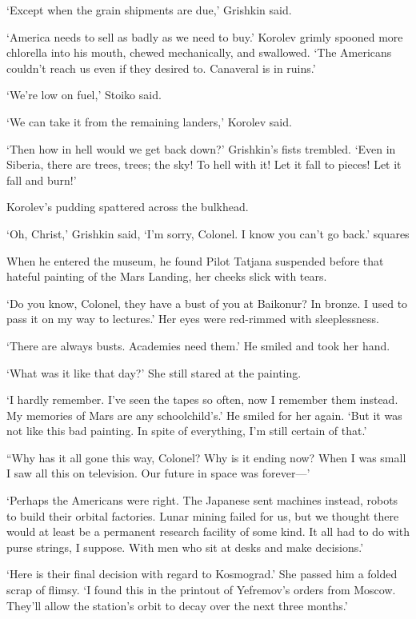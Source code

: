 ‘Except when the grain shipments are due,’ Grishkin said.

‘America needs to sell as badly as we need to buy.’ Korolev grimly spooned more chlorella into his mouth, chewed mechanically, and swallowed. ‘The Americans couldn’t reach us even if they desired to. Canaveral is in ruins.’

‘We’re low on fuel,’ Stoiko said.

‘We can take it from the remaining landers,’ Korolev said.

‘Then how in hell would we get back down?’ Grishkin’s fists trembled. ‘Even in Siberia, there are trees, trees; the sky! To hell with it! Let it fall to pieces! Let it fall and burn!’

Korolev’s pudding spattered across the bulkhead.

‘Oh, Christ,’ Grishkin said, ‘I’m sorry, Colonel. I know you can’t go back.’
squares

When he entered the museum, he found Pilot Tatjana suspended before that hateful painting of the Mars Landing, her cheeks slick with tears.

‘Do you know, Colonel, they have a bust of you at Baikonur? In bronze. I used to pass it on my way to lectures.’ Her eyes were red-rimmed with sleeplessness.

‘There are always busts. Academies need them.’ He smiled and took her hand.

‘What was it like that day?’ She still stared at the painting.

‘I hardly remember. I’ve seen the tapes so often, now I remember them instead. My memories of Mars are any schoolchild’s.’ He smiled for her again. ‘But it was not like this bad painting. In spite of everything, I’m still certain of that.’

“Why has it all gone this way, Colonel? Why is it ending now? When I was small I saw all this on television. Our future in space was forever—’

‘Perhaps the Americans were right. The Japanese sent machines instead, robots to build their orbital factories. Lunar mining failed for us, but we thought there would at least be a permanent research facility of some kind. It all had to do with purse strings, I suppose. With men who sit at desks and make decisions.’

‘Here is their final decision with regard to Kosmograd.’ She passed him a folded scrap of flimsy. ‘I found this in the printout of Yefremov’s orders from Moscow. They’ll allow the station’s orbit to decay over the next three months.’

